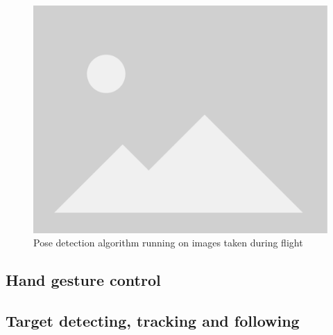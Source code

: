 \begin{figure}
  \centering
  \includegraphics[width=.6\textwidth, keepaspectratio]{img/placeholder.png}
  \caption{Pose detection algorithm running on images taken during flight}\label{fig:flight-test-cam}
\end{figure}


\subsection{Hand gesture control}
\label{sec:test-9-hand}


\subsection{Target detecting, tracking and following}
\label{sec:test-10-follow}

